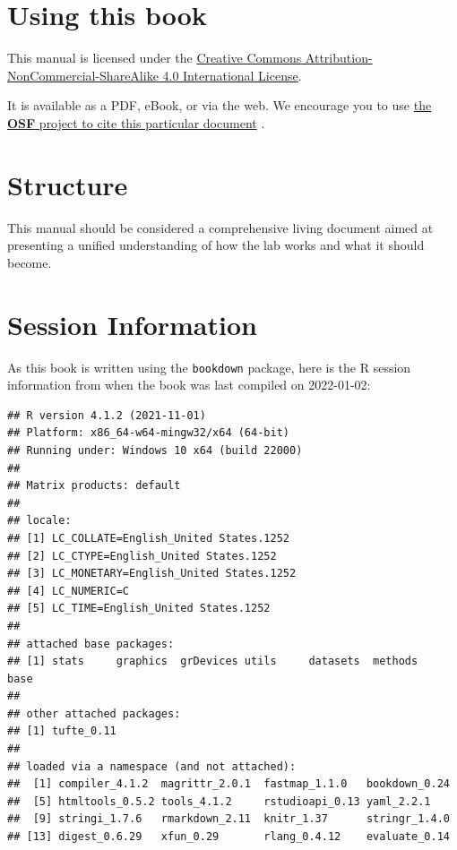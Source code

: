 \documentclass[]{tufte-book}
\begin{document}
\hypertarget{using-this-book}{%
\section*{Using this book}\label{using-this-book}}

This manual is licensed under the \href{http://creativecommons.org/licenses/by-nc-sa/4.0/}{Creative Commons Attribution-NonCommercial-ShareAlike 4.0 International License}.

It is available as a PDF, eBook, or via the web. We encourage you to use \href{https://osf.io/upa25/}{the \textbf{OSF} project to cite this particular document} \citep{straightMAVRXLabManual2021}.

\hypertarget{structure}{%
\section*{Structure}\label{structure}}

This manual should be considered a comprehensive living document aimed at presenting a unified understanding of how the lab works and what it should become.

\hypertarget{session-information}{%
\section*{Session Information}\label{session-information}}

As this book is written using the \texttt{bookdown} package, here is the R session information from when the book was last compiled on 2022-01-02:

\begin{verbatim}
## R version 4.1.2 (2021-11-01)
## Platform: x86_64-w64-mingw32/x64 (64-bit)
## Running under: Windows 10 x64 (build 22000)
## 
## Matrix products: default
## 
## locale:
## [1] LC_COLLATE=English_United States.1252 
## [2] LC_CTYPE=English_United States.1252   
## [3] LC_MONETARY=English_United States.1252
## [4] LC_NUMERIC=C                          
## [5] LC_TIME=English_United States.1252    
## 
## attached base packages:
## [1] stats     graphics  grDevices utils     datasets  methods   base     
## 
## other attached packages:
## [1] tufte_0.11
## 
## loaded via a namespace (and not attached):
##  [1] compiler_4.1.2  magrittr_2.0.1  fastmap_1.1.0   bookdown_0.24  
##  [5] htmltools_0.5.2 tools_4.1.2     rstudioapi_0.13 yaml_2.2.1     
##  [9] stringi_1.7.6   rmarkdown_2.11  knitr_1.37      stringr_1.4.0  
## [13] digest_0.6.29   xfun_0.29       rlang_0.4.12    evaluate_0.14
\end{verbatim}
\end{document}
